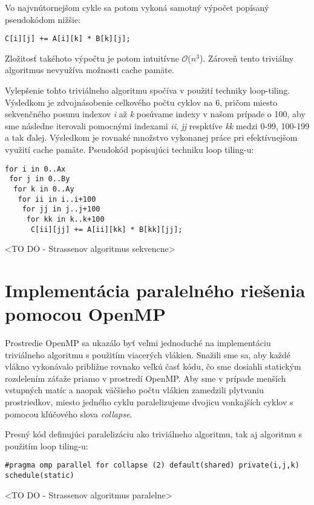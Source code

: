 \documentclass[slovak]{article}
\begin{document}
Vo najvnútornejšom cykle sa potom vykoná samotný výpočet popísaný pseudokódom nižšie:

\begin{verbatim}
C[i][j] += A[i][k] * B[k][j];
\end{verbatim}

Zložitosť takéhoto výpočtu je potom intuitívne $\mathcal{O}$($n^3$). Zároveň tento triviálny algoritmus nevyužíva možnosti cache pamäte.

Vylepšenie tohto triviálneho algoritmu spočíva v použití techniky loop-tiling. Výsledkom je zdvojnásobenie celkového počtu cyklov na 6, pričom miesto sekvenčného posunu indexov \emph{i} až \emph{k} posúvame indexy v našom prípade o 100, aby sme následne iterovali pomocnými indexami \emph{ii}, \emph{jj} respktíve \emph{kk} medzi 0-99, 100-199 a tak ďalej. Výsledkom je rovnaké množstvo vykonanej práce pri efektívnejšom využití cache pamäte. Pseudokód popisujúci techniku loop tiling-u:

\begin{verbatim}
for i in 0..Ax
 for j in 0..By
  for k in 0..Ay
   for ii in i..i+100 
    for jj in j..j+100
     for kk in k..k+100
      C[ii][jj] += A[ii][kk] * B[kk][jj];
\end{verbatim}

<TO DO - Strassenov algoritmus sekvencne>

\section{Implementácia paralelného riešenia pomocou OpenMP}

Prostredie OpenMP sa ukazálo byť veľmi jednoduché na implementáciu triviálneho algoritmu s použitím viacerých vlákien. Snažili sme sa, aby každé vlákno vykonávalo približne rovnako veľkú časť kódu, čo sme dosiahli statickým rozdelením záťaže priamo v prostredí OpenMP. Aby sme v prípade menších vstupných matíc a naopak väčšieho počtu vlákien zamedzili plytvaniu prostriedkov, miesto jedného cyklu paralelizujeme dvojicu vonkajších cyklov s pomocou kľúčového slova \emph{collapse}.

Presný kód definujúci paralelizáciu ako triviálneho algoritmu, tak aj algoritmu s použitím loop tiling-u:

\begin{verbatim}
#pragma omp parallel for collapse (2) default(shared) private(i,j,k)
schedule(static)
\end{verbatim}

<TO DO - Strassenov algoritmus paralelne>
\end{document}
